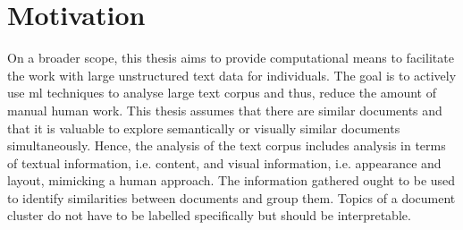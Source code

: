 \section{Motivation}\label{sec:motivation}

On a broader scope, this thesis aims to provide computational means to facilitate the work with large unstructured text data for individuals.
The goal is to actively use \ac{ml} techniques to analyse large text corpus and thus, reduce the amount of manual human work.
This thesis assumes that there are similar documents and that it is valuable to explore semantically or visually similar documents simultaneously.
Hence, the analysis of the text corpus includes analysis in terms of textual information, i.e. content, and visual information, i.e. appearance and layout, mimicking a human approach.
The information gathered ought to be used to identify similarities between documents and group them.
Topics of a document cluster do not have to be labelled specifically but should be interpretable.
